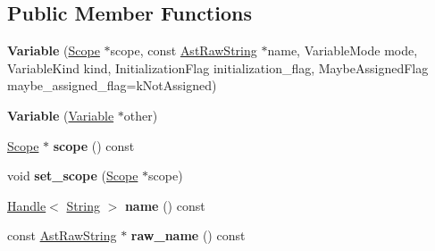 \subsection*{Public Member Functions}
\begin{DoxyCompactItemize}
\item 
\mbox{\label{classv8_1_1internal_1_1Variable_aea566e4207a6b3749abb9928e1e43bdd}} 
{\bfseries Variable} (\mbox{\hyperlink{classv8_1_1internal_1_1Scope}{Scope}} $\ast$scope, const \mbox{\hyperlink{classv8_1_1internal_1_1AstRawString}{Ast\+Raw\+String}} $\ast$name, Variable\+Mode mode, Variable\+Kind kind, Initialization\+Flag initialization\+\_\+flag, Maybe\+Assigned\+Flag maybe\+\_\+assigned\+\_\+flag=k\+Not\+Assigned)
\item 
\mbox{\label{classv8_1_1internal_1_1Variable_ad4710b6967f384542bb635cde681e358}} 
{\bfseries Variable} (\mbox{\hyperlink{classv8_1_1internal_1_1Variable}{Variable}} $\ast$other)
\item 
\mbox{\label{classv8_1_1internal_1_1Variable_a4a1d33eb249c44053f56974263a5d83e}} 
\mbox{\hyperlink{classv8_1_1internal_1_1Scope}{Scope}} $\ast$ {\bfseries scope} () const
\item 
\mbox{\label{classv8_1_1internal_1_1Variable_ade5293caabe38c5cea85b14433b1188e}} 
void {\bfseries set\+\_\+scope} (\mbox{\hyperlink{classv8_1_1internal_1_1Scope}{Scope}} $\ast$scope)
\item 
\mbox{\label{classv8_1_1internal_1_1Variable_a013534bda02e7dc597b0c8fbb00c44b0}} 
\mbox{\hyperlink{classv8_1_1internal_1_1Handle}{Handle}}$<$ \mbox{\hyperlink{classv8_1_1internal_1_1String}{String}} $>$ {\bfseries name} () const
\item 
\mbox{\label{classv8_1_1internal_1_1Variable_ad9c3be6f323e55192a136cca2e010b8e}} 
const \mbox{\hyperlink{classv8_1_1internal_1_1AstRawString}{Ast\+Raw\+String}} $\ast$ {\bfseries raw\+\_\+name} () const
\item 
\mbox{\label{classv8_1_1internal_1_1Variable_a23116083f634f5d3c5cad8b44fdd5905}} 

\end{DoxyCompactItemize}
